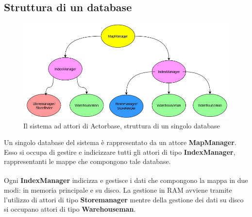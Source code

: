 \documentclass[a4paper]{article}
\begin{document}
	\subsection{Struttura di un database}
					\begin{figure}[H]
					\centering
					\includegraphics[width=\textwidth]{immagini/ST/database}
					\caption{Il sistema ad attori di Actorbase, struttura di un singolo database}
				\end{figure}
Un singolo database del sistema è rappresentato da un attore \textbf{MapManager}. Esso si occupa di gestire e indicizzare tutti gli attori di tipo \textbf{IndexManager}, rappresentanti le mappe che compongono tale database.
\\ \\
Ogni \textbf{IndexManager} indicizza e gestisce i dati che compongono la mappa in due modi: in memoria principale e su disco. La gestione in RAM avviene tramite l'utilizzo di attori di tipo \textbf{Storemanager} mentre della gestione dei dati su disco si occupano attori di tipo \textbf{Warehouseman}.
\end{document}
